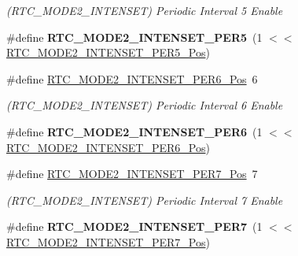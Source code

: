 \begin{DoxyCompactItemize}
\begin{DoxyCompactList}\small\item\em (R\+T\+C\+\_\+\+M\+O\+D\+E2\+\_\+\+I\+N\+T\+E\+N\+S\+E\+T) Periodic Interval 5 Enable \end{DoxyCompactList}\item 
\hypertarget{group___s_a_m_l21___r_t_c_gaa56b5b32d03e7545637897fc6eeabdbb}{}\#define {\bfseries R\+T\+C\+\_\+\+M\+O\+D\+E2\+\_\+\+I\+N\+T\+E\+N\+S\+E\+T\+\_\+\+P\+E\+R5}~(1 $<$$<$ \hyperlink{group___s_a_m_l21___r_t_c_ga19d32e2c705aafd9e35ea9d77637e68f}{R\+T\+C\+\_\+\+M\+O\+D\+E2\+\_\+\+I\+N\+T\+E\+N\+S\+E\+T\+\_\+\+P\+E\+R5\+\_\+\+Pos})\label{group___s_a_m_l21___r_t_c_gaa56b5b32d03e7545637897fc6eeabdbb}

\item 
\hypertarget{group___s_a_m_l21___r_t_c_ga8959e7f6b569a2b599fa8da58f8d8fae}{}\#define \hyperlink{group___s_a_m_l21___r_t_c_ga8959e7f6b569a2b599fa8da58f8d8fae}{R\+T\+C\+\_\+\+M\+O\+D\+E2\+\_\+\+I\+N\+T\+E\+N\+S\+E\+T\+\_\+\+P\+E\+R6\+\_\+\+Pos}~6\label{group___s_a_m_l21___r_t_c_ga8959e7f6b569a2b599fa8da58f8d8fae}

\begin{DoxyCompactList}\small\item\em (R\+T\+C\+\_\+\+M\+O\+D\+E2\+\_\+\+I\+N\+T\+E\+N\+S\+E\+T) Periodic Interval 6 Enable \end{DoxyCompactList}\item 
\hypertarget{group___s_a_m_l21___r_t_c_ga5986ecad0de12def8f1a602aac1fb09c}{}\#define {\bfseries R\+T\+C\+\_\+\+M\+O\+D\+E2\+\_\+\+I\+N\+T\+E\+N\+S\+E\+T\+\_\+\+P\+E\+R6}~(1 $<$$<$ \hyperlink{group___s_a_m_l21___r_t_c_ga8959e7f6b569a2b599fa8da58f8d8fae}{R\+T\+C\+\_\+\+M\+O\+D\+E2\+\_\+\+I\+N\+T\+E\+N\+S\+E\+T\+\_\+\+P\+E\+R6\+\_\+\+Pos})\label{group___s_a_m_l21___r_t_c_ga5986ecad0de12def8f1a602aac1fb09c}

\item 
\hypertarget{group___s_a_m_l21___r_t_c_gacc388b9dc17acf265937082d590bb752}{}\#define \hyperlink{group___s_a_m_l21___r_t_c_gacc388b9dc17acf265937082d590bb752}{R\+T\+C\+\_\+\+M\+O\+D\+E2\+\_\+\+I\+N\+T\+E\+N\+S\+E\+T\+\_\+\+P\+E\+R7\+\_\+\+Pos}~7\label{group___s_a_m_l21___r_t_c_gacc388b9dc17acf265937082d590bb752}

\begin{DoxyCompactList}\small\item\em (R\+T\+C\+\_\+\+M\+O\+D\+E2\+\_\+\+I\+N\+T\+E\+N\+S\+E\+T) Periodic Interval 7 Enable \end{DoxyCompactList}\item 
\hypertarget{group___s_a_m_l21___r_t_c_ga96cc54fda927480e8ea04ecf6b666f77}{}\#define {\bfseries R\+T\+C\+\_\+\+M\+O\+D\+E2\+\_\+\+I\+N\+T\+E\+N\+S\+E\+T\+\_\+\+P\+E\+R7}~(1 $<$$<$ \hyperlink{group___s_a_m_l21___r_t_c_gacc388b9dc17acf265937082d590bb752}{R\+T\+C\+\_\+\+M\+O\+D\+E2\+\_\+\+I\+N\+T\+E\+N\+S\+E\+T\+\_\+\+P\+E\+R7\+\_\+\+Pos})\label{group___s_a_m_l21___r_t_c_ga96cc54fda927480e8ea04ecf6b666f77}


\end{DoxyCompactItemize}
